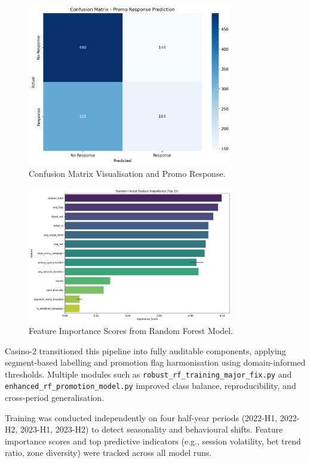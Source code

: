 \documentclass[12pt,a4paper]{report}
\begin{document}
\begin{figure}[H]
\centering
\includegraphics[width=0.8\textwidth]{figures/confusion_matrix.png}
\caption{Confusion Matrix Visualisation and Promo Response.}
\label{fig:confusion_matrix}
\end{figure}

\begin{figure}[H]
\centering
\includegraphics[width=0.8\textwidth]{figures/feature_importance.png}
\caption{Feature Importance Scores from Random Forest Model.}
\label{fig:feature-importance}
\end{figure}

Casino-2 transitioned this pipeline into fully auditable components, applying segment-based labelling and promotion flag harmonisation using domain-informed thresholds. Multiple modules such as \texttt{robust\_rf\_training\_major\_fix.py} and \texttt{enhanced\_rf\_promotion\_model.py} improved class balance, reproducibility, and cross-period generalisation.

Training was conducted independently on four half-year periods (2022-H1, 2022-H2, 2023-H1, 2023-H2) to detect seasonality and behavioural shifts. Feature importance scores and top predictive indicators (e.g., session volatility, bet trend ratio, zone diversity) were tracked across all model runs.
\end{document}
